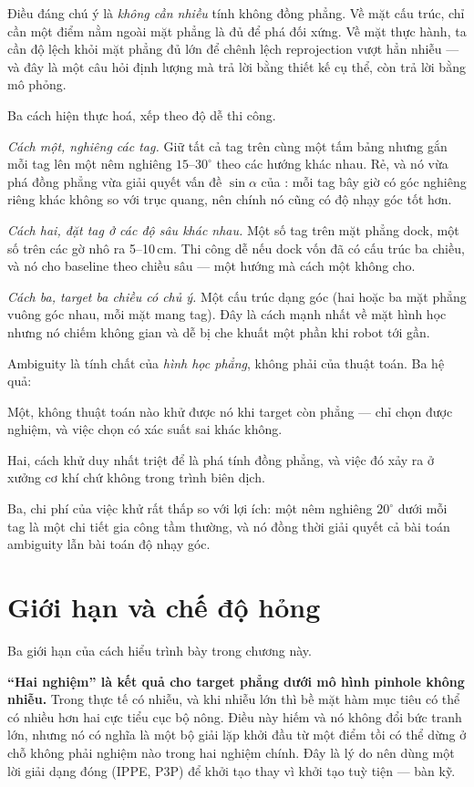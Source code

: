 \documentclass[../../marker.tex]{subfiles}
\begin{document}
Điều đáng chú ý là \emph{không cần nhiều} tính không đồng phẳng. Về mặt cấu trúc, chỉ cần một điểm nằm ngoài mặt phẳng là đủ để phá đối xứng. Về mặt thực hành, ta cần độ lệch khỏi mặt phẳng đủ lớn để chênh lệch reprojection vượt hẳn nhiễu --- và đây là một câu hỏi định lượng mà  trả lời bằng thiết kế cụ thể, còn  trả lời bằng mô phỏng.

Ba cách hiện thực hoá, xếp theo độ dễ thi công.

\emph{Cách một, nghiêng các tag.} Giữ tất cả tag trên cùng một tấm bảng nhưng gắn mỗi tag lên một nêm nghiêng \(15\text{--}30^\circ\) theo các hướng khác nhau. Rẻ, và nó vừa phá đồng phẳng vừa giải quyết vấn đề \(\sin\alpha\) của : mỗi tag bây giờ có góc nghiêng riêng khác không so với trục quang, nên chính nó cũng có độ nhạy góc tốt hơn.

\emph{Cách hai, đặt tag ở các độ sâu khác nhau.} Một số tag trên mặt phẳng dock, một số trên các gờ nhô ra 5--10\,cm. Thi công dễ nếu dock vốn đã có cấu trúc ba chiều, và nó cho baseline theo chiều sâu --- một hướng mà cách một không cho.

\emph{Cách ba, target ba chiều có chủ ý.} Một cấu trúc dạng góc (hai hoặc ba mặt phẳng vuông góc nhau, mỗi mặt mang tag). Đây là cách mạnh nhất về mặt hình học nhưng nó chiếm không gian và dễ bị che khuất một phần khi robot tới gần.

\begin{cannho}
Ambiguity là tính chất của \emph{hình học phẳng}, không phải của thuật toán. Ba hệ quả:

Một, không thuật toán nào khử được nó khi target còn phẳng --- chỉ chọn được nghiệm, và việc chọn có xác suất sai khác không.

Hai, cách khử duy nhất triệt để là phá tính đồng phẳng, và việc đó xảy ra ở xưởng cơ khí chứ không trong trình biên dịch.

Ba, chi phí của việc khử rất thấp so với lợi ích: một nêm nghiêng \(20^\circ\) dưới mỗi tag là một chi tiết gia công tầm thường, và nó đồng thời giải quyết cả bài toán ambiguity lẫn bài toán độ nhạy góc.
\end{cannho}

\section{Giới hạn và chế độ hỏng}

Ba giới hạn của cách hiểu trình bày trong chương này.

\textbf{``Hai nghiệm'' là kết quả cho target phẳng dưới mô hình pinhole không nhiễu.} Trong thực tế có nhiễu, và khi nhiễu lớn thì bề mặt hàm mục tiêu có thể có nhiều hơn hai cực tiểu cục bộ nông. Điều này hiếm và nó không đổi bức tranh lớn, nhưng nó có nghĩa là một bộ giải lặp khởi đầu từ một điểm tồi có thể dừng ở chỗ không phải nghiệm nào trong hai nghiệm chính. Đây là lý do nên dùng một lời giải dạng đóng (IPPE, P3P) để khởi tạo thay vì khởi tạo tuỳ tiện ---  bàn kỹ.
\end{document}

